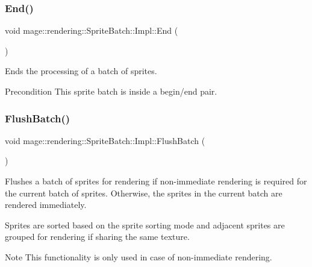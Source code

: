 \subsubsection{\texorpdfstring{End()}{End()}}
{\footnotesize\ttfamily void mage\+::rendering\+::\+Sprite\+Batch\+::\+Impl\+::\+End (\begin{DoxyParamCaption}{ }\end{DoxyParamCaption})}

Ends the processing of a batch of sprites.

\begin{DoxyPrecond}{Precondition}
This sprite batch is inside a begin/end pair. 
\end{DoxyPrecond}
\mbox{\label{classmage_1_1rendering_1_1_sprite_batch_1_1_impl_a65afd35385400d629abc9f60adfadeff}} 
\subsubsection{\texorpdfstring{Flush\+Batch()}{FlushBatch()}}
{\footnotesize\ttfamily void mage\+::rendering\+::\+Sprite\+Batch\+::\+Impl\+::\+Flush\+Batch (\begin{DoxyParamCaption}{ }\end{DoxyParamCaption})\hspace{0.3cm}{\ttfamily [private]}}

Flushes a batch of sprites for rendering if non-\/immediate rendering is required for the current batch of sprites. Otherwise, the sprites in the current batch are rendered immediately.

Sprites are sorted based on the sprite sorting mode and adjacent sprites are grouped for rendering if sharing the same texture.

\begin{DoxyNote}{Note}
This functionality is only used in case of non-\/immediate rendering. 
\end{DoxyNote}
\mbox{\label{classmage_1_1rendering_1_1_sprite_batch_1_1_impl_abcbbd766f6b1355e5d015cbdcaacfc07}} 

